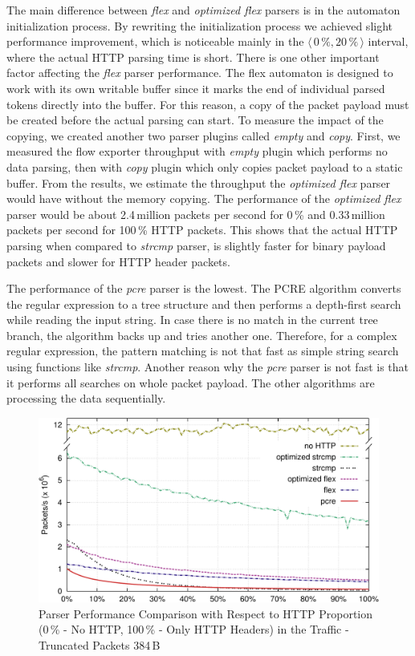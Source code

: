 The main difference between \emph{flex} and \emph{optimized flex} parsers is in the automaton initialization process. By rewriting the initialization process we achieved slight performance improvement, which is noticeable mainly in the $\langle\,0\,\%,20\,\%\,\rangle$ interval, where the actual HTTP parsing time is short. There is one other important factor affecting the \emph{flex} parser performance. The flex automaton is designed to work with its own writable buffer since it marks the end of individual parsed tokens directly into the buffer. For this reason, a copy of the packet payload must be created before the actual parsing can start. To measure the impact of the copying, we created another two parser plugins called \emph{empty} and \emph{copy}. First, we measured the flow exporter throughput with \emph{empty} plugin which performs no data parsing, then with \emph{copy} plugin which only copies packet payload to a static buffer. From the results, we estimate the throughput the \emph{optimized flex} parser would have without the memory copying. The performance of the \emph{optimized flex} parser would be about 2.4\,million packets per second for 0\,\% and 0.33\,million packets per second for 100\,\% HTTP packets. This shows that the actual HTTP parsing when compared to \emph{strcmp} parser, is slightly faster for binary payload packets and slower for HTTP header packets.

The performance of the \emph{pcre} parser is the lowest. The PCRE algorithm converts the regular expression to a tree structure and then performs a depth-first search while reading the input string. In case there is no match in the current tree branch, the algorithm backs up and tries another one. Therefore, for a complex regular expression, the pattern matching is not that fast as simple string search using functions like \emph{strcmp}. Another reason why the \emph{pcre} parser is not fast is that it performs all searches on whole packet payload. The other algorithms are processing the data sequentially.

\begin{figure}
        \centering
        \includegraphics[width=\textwidth]{figures/paper-http/384_pcap_norm_1}
        \caption{Parser Performance Comparison with Respect to HTTP Proportion (0\,\% - No HTTP, 100\,\% - Only HTTP Headers) in the Traffic - Truncated Packets 384\,B}
        \label{fig:http-pcap_384}
\end{figure}

